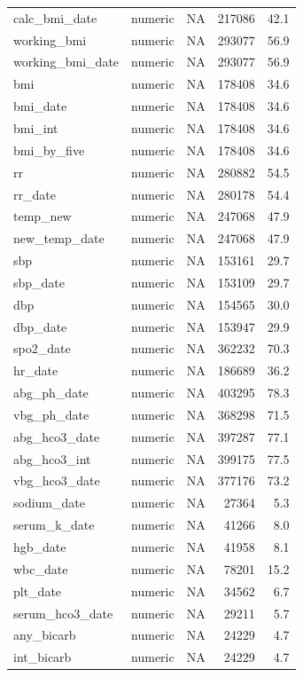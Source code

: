 \documentclass[
  11pt,
  letterpaper,
  DIV=11,
  numbers=noendperiod]{scrartcl}
\begin{document}
\begin{longtable*}{llrrr}
\addlinespace
calc\_bmi\_date & numeric & NA & 217086 & 42.1\\
working\_bmi & numeric & NA & 293077 & 56.9\\
working\_bmi\_date & numeric & NA & 293077 & 56.9\\
bmi & numeric & NA & 178408 & 34.6\\
bmi\_date & numeric & NA & 178408 & 34.6\\
\addlinespace
bmi\_int & numeric & NA & 178408 & 34.6\\
bmi\_by\_five & numeric & NA & 178408 & 34.6\\
rr & numeric & NA & 280882 & 54.5\\
rr\_date & numeric & NA & 280178 & 54.4\\
temp\_new & numeric & NA & 247068 & 47.9\\
\addlinespace
new\_temp\_date & numeric & NA & 247068 & 47.9\\
sbp & numeric & NA & 153161 & 29.7\\
sbp\_date & numeric & NA & 153109 & 29.7\\
dbp & numeric & NA & 154565 & 30.0\\
dbp\_date & numeric & NA & 153947 & 29.9\\
\addlinespace
spo2\_date & numeric & NA & 362232 & 70.3\\
hr\_date & numeric & NA & 186689 & 36.2\\
abg\_ph\_date & numeric & NA & 403295 & 78.3\\
vbg\_ph\_date & numeric & NA & 368298 & 71.5\\
abg\_hco3\_date & numeric & NA & 397287 & 77.1\\
\addlinespace
abg\_hco3\_int & numeric & NA & 399175 & 77.5\\
vbg\_hco3\_date & numeric & NA & 377176 & 73.2\\
sodium\_date & numeric & NA & 27364 & 5.3\\
serum\_k\_date & numeric & NA & 41266 & 8.0\\
hgb\_date & numeric & NA & 41958 & 8.1\\
\addlinespace
wbc\_date & numeric & NA & 78201 & 15.2\\
plt\_date & numeric & NA & 34562 & 6.7\\
serum\_hco3\_date & numeric & NA & 29211 & 5.7\\
any\_bicarb & numeric & NA & 24229 & 4.7\\
int\_bicarb & numeric & NA & 24229 & 4.7\\

\end{longtable*}
\end{document}

